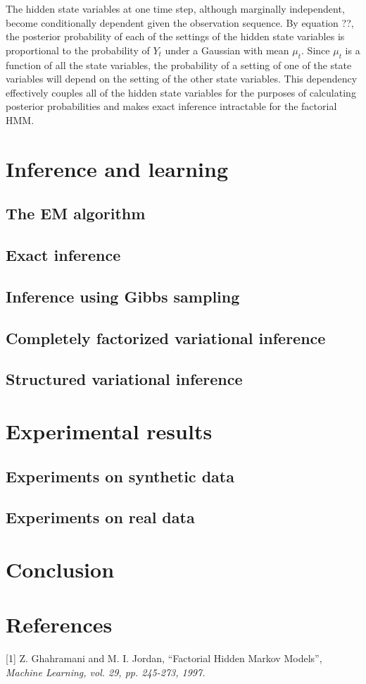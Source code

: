 \documentclass{article}
\begin{document}
The hidden state variables at one time step, although marginally independent, become conditionally dependent given the observation sequence. By equation ??, the posterior probability of each of the settings of the hidden state variables is proportional to the probability of $Y_t$ under a Gaussian with mean $\mu_t$. Since $\mu_t$ is a function of all the state variables, the probability of a setting of one of the state variables will depend on the setting of the other state variables. This dependency effectively couples all of the hidden state variables for the purposes of calculating posterior probabilities and makes exact inference intractable for the factorial HMM.

\section{Inference and learning}

\subsection{The EM algorithm}

\subsection{Exact inference	}

\subsection{Inference using Gibbs sampling}

\subsection{Completely factorized variational inference}

\subsection{Structured variational inference}

\section{Experimental results}

\subsection{Experiments on synthetic data}

\subsection{Experiments on real data}

\section{Conclusion}

\section*{References}

\small

[1] Z. Ghahramani and M. I. Jordan, ``Factorial Hidden Markov Models'', \it{Machine Learning}, vol. 29, pp. 245-273, 1997.
\end{document}
